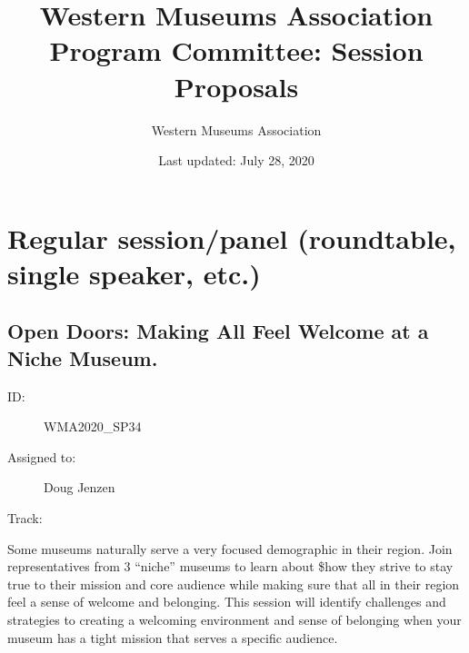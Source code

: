 \documentclass{report}
\title{ Western Museums Association Program Committee: Session Proposals }
\date{ Last updated: July 28, 2020}
\author{Western Museums Association}
\begin{document}
  \maketitle
  \newpage
  \tableofcontents
  \newpage
  
    \newpage
    \chapter*{ Regular session/panel (roundtable, single speaker, etc.) }

      
        
        
        
        
          \newpage
          \section{ Open Doors:  Making All Feel Welcome at a Niche Museum.  }
            \begin{description}
              \item [ID:]
              WMA2020\_SP34

              \item [Assigned to:]Doug Jenzen~
                \item [Track:]
              \end{description}

              Some museums naturally serve a very focused demographic in their region. Join representatives from 3 “niche” museums to learn about \$how they strive to stay true to their mission and core audience while making sure that all in their region feel a sense of welcome and belonging. This session will identify challenges and strategies to creating a welcoming environment and sense of belonging when your museum has a tight mission that serves a specific audience.
\end{document}
